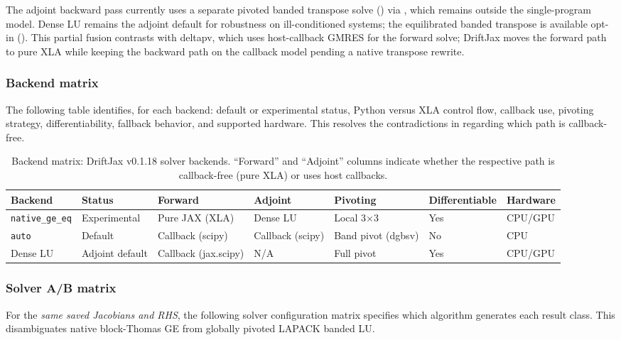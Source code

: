 The adjoint backward pass currently uses a separate pivoted banded transpose
solve () via , which
remains outside the single-program model. Dense LU remains the adjoint default
for robustness on ill-conditioned systems; the equilibrated banded transpose
is available opt-in (). This partial fusion
contrasts with deltapv, which uses host-callback GMRES for the forward solve;
DriftJax moves the forward path to pure XLA while keeping the backward path on
the callback model pending a native transpose rewrite.

\subsubsection{Backend matrix}
\label{sec:backend-matrix}
The following table identifies, for each backend: default or experimental status, Python versus XLA control flow, callback use, pivoting strategy, differentiability, fallback behavior, and supported hardware. This resolves the contradictions in \cite{mann2022partial} regarding which path is callback-free.

\begin{table}[tbp]
\centering
\caption{Backend matrix: DriftJax v0.1.18 solver backends. ``Forward'' and ``Adjoint'' columns indicate whether the respective path is callback-free (pure XLA) or uses host callbacks.}
\label{tab:backend-matrix}
\begin{tabular}{@{}lllllll@{}}
\toprule
Backend & Status & Forward & Adjoint & Pivoting & Differentiable & Hardware \\
\midrule
\texttt{native\_ge\_eq} & Experimental & Pure JAX (XLA) & Dense LU & Local 3×3 & Yes & CPU/GPU \\
\texttt{auto} & Default & Callback (scipy) & Callback (scipy) & Band pivot (dgbsv) & No & CPU \\
Dense LU & Adjoint default & Callback (jax.scipy) & N/A & Full pivot & Yes & CPU/GPU \\
\bottomrule
\end{tabular}
\end{table}

\subsubsection{Solver A/B matrix}
\label{sec:solver-ab-matrix}
For the \emph{same saved Jacobians and RHS}, the following solver
configuration matrix specifies which algorithm generates each result
class. This disambiguates native block-Thomas GE from globally pivoted
LAPACK banded LU.

